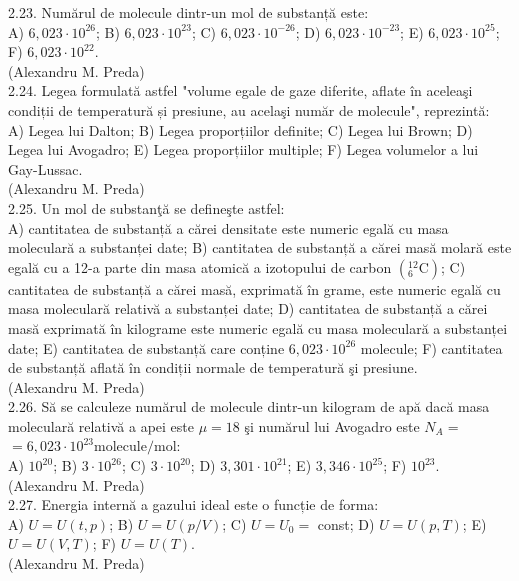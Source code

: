 2.23. Numărul de molecule dintr-un mol de substanță este:\\ A) $6,023 \cdot 10^{26}$; B) $6,023 \cdot 10^{23}$; C) $6,023 \cdot 10^{-26}$; D) $6,023 \cdot 10^{-23}$; E) $6,023 \cdot 10^{25}$; F) $6,023 \cdot 10^{22}$.\\ (Alexandru M. Preda)\\

2.24. Legea formulată astfel "volume egale de gaze diferite, aflate în aceleaşi condiții de temperatură și presiune, au acelaşi număr de molecule", reprezintă:\\ A) Legea lui Dalton; B) Legea proporțiilor definite; C) Legea lui Brown; D) Legea lui Avogadro; E) Legea proporțiilor multiple; F) Legea volumelor a lui Gay-Lussac.\\ (Alexandru M. Preda)\\

2.25. Un mol de substanţă se defineşte astfel:\\ A) cantitatea de substanță a cărei densitate este numeric egală cu masa moleculară a substanței date; B) cantitatea de substanță a cărei masă molară este egală cu a 12-a parte din masa atomică a izotopului de carbon $\left({ }_{6}^{12} \mathrm{C}\right)$; C) cantitatea de substanță a cărei masă, exprimată în grame, este numeric egală cu masa moleculară relativă a substanței date; D) cantitatea de substanță a cărei masă exprimată în kilograme este numeric egală cu masa moleculară a substanței date; E) cantitatea de substanță care conține $6,023 \cdot 10^{26}$ molecule; F) cantitatea de substanță aflată în condiții normale de temperatură şi presiune.\\ (Alexandru M. Preda)\\

2.26. Să se calculeze numărul de molecule dintr-un kilogram de apă dacă masa moleculară relativă a apei este $\mu=18$ şi numărul lui Avogadro este $N_{A}=$ $=6,023 \cdot 10^{23} \mathrm{molecule} / \mathrm{mol}$:\\ A) $10^{20}$; B) $3 \cdot 10^{26}$; C) $3 \cdot 10^{20}$; D) $3,301 \cdot 10^{21}$; E) $3,346 \cdot 10^{25}$; F) $10^{23}$.\\ (Alexandru M. Preda)\\

2.27. Energia internă a gazului ideal este o funcție de forma:\\ A) $U=U(t, p)$; B) $U=U(p / V)$; C) $U=U_{0}=$ const; D) $U=U(p, T)$; E) $U=U(V, T)$; F) $U=U(T)$.\\ (Alexandru M. Preda)\\

